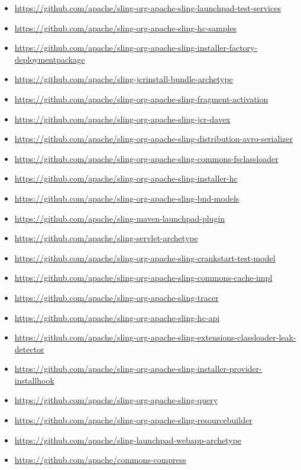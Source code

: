\documentclass[sigconf]{acmart}
\begin{document}
\begin{itemize}
  \item \url{https://github.com/apache/sling-org-apache-sling-launchpad-test-services}
  \item \url{https://github.com/apache/sling-org-apache-sling-hc-samples}
  \item \url{https://github.com/apache/sling-org-apache-sling-installer-factory-deploymentpackage}
  \item \url{https://github.com/apache/sling-jcrinstall-bundle-archetype}
  \item \url{https://github.com/apache/sling-org-apache-sling-fragment-activation}
  \item \url{https://github.com/apache/sling-org-apache-sling-jcr-davex}
  \item \url{https://github.com/apache/sling-org-apache-sling-distribution-avro-serializer}
  \item \url{https://github.com/apache/sling-org-apache-sling-commons-fsclassloader}
  \item \url{https://github.com/apache/sling-org-apache-sling-installer-hc}
  \item \url{https://github.com/apache/sling-org-apache-sling-bnd-models}
  \item \url{https://github.com/apache/sling-maven-launchpad-plugin}
  \item \url{https://github.com/apache/sling-servlet-archetype}
  \item \url{https://github.com/apache/sling-org-apache-sling-crankstart-test-model}
  \item \url{https://github.com/apache/sling-org-apache-sling-commons-cache-impl}
  \item \url{https://github.com/apache/sling-org-apache-sling-tracer}
  \item \url{https://github.com/apache/sling-org-apache-sling-hc-api}
  \item \url{https://github.com/apache/sling-org-apache-sling-extensions-classloader-leak-detector}
  \item \url{https://github.com/apache/sling-org-apache-sling-installer-provider-installhook}
  \item \url{https://github.com/apache/sling-org-apache-sling-query}
  \item \url{https://github.com/apache/sling-org-apache-sling-resourcebuilder}
  \item \url{https://github.com/apache/sling-launchpad-webapp-archetype}
  \item \url{https://github.com/apache/commons-compress}

\end{itemize}
\end{document}
